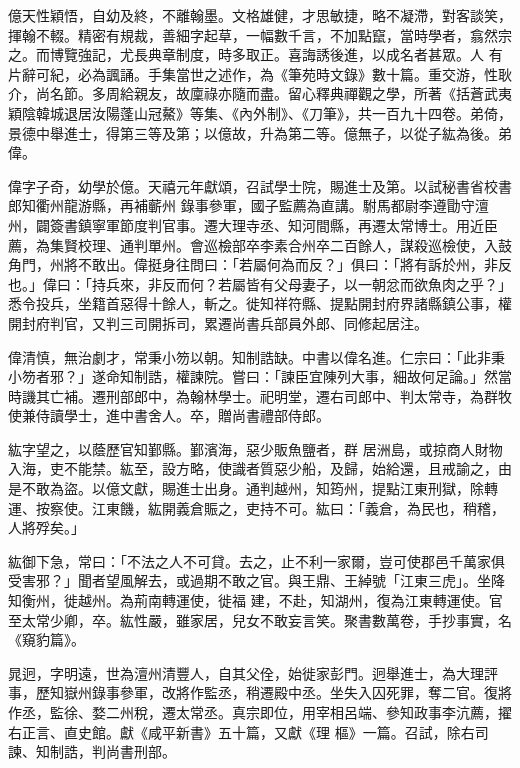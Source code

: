 \begin{pinyinscope}
 億天性穎悟，自幼及終，不離翰墨。文格雄健，才思敏捷，略不凝滯，對客談笑，揮翰不輟。精密有規裁，善細字起草，一幅數千言，不加點竄，當時學者，翕然宗之。而博覽強記，尤長典章制度，時多取正。喜誨誘後進，以成名者甚眾。人
 有片辭可紀，必為諷誦。手集當世之述作，為《筆苑時文錄》數十篇。重交游，性耿介，尚名節。多周給親友，故廩祿亦隨而盡。留心釋典禪觀之學，所著《括蒼武夷穎陰韓城退居汝陽蓬山冠鰲》等集、《內外制》、《刀筆》，共一百九十四卷。弟倚，景德中舉進士，得第三等及第；以億故，升為第二等。億無子，以從子紘為後。弟偉。



 偉字子奇，幼學於億。天禧元年獻頌，召試學士院，賜進士及第。以試秘書省校書郎知衢州龍游縣，再補蘄州
 錄事參軍，國子監薦為直講。駙馬都尉李遵勖守澶州，闢簽書鎮寧軍節度判官事。遷大理寺丞、知河間縣，再遷太常博士。用近臣薦，為集賢校理、通判單州。會巡檢部卒李素合州卒二百餘人，謀殺巡檢使，入鼓角門，州將不敢出。偉挺身往問曰：「若屬何為而反？」俱曰：「將有訴於州，非反也。」偉曰：「持兵來，非反而何？若屬皆有父母妻子，以一朝忿而欲魚肉之乎？」悉令投兵，坐籍首惡得十餘人，斬之。徙知祥符縣、提點開封府界諸縣鎮公事，權
 開封府判官，又判三司開拆司，累遷尚書兵部員外郎、同修起居注。



 偉清慎，無治劇才，常秉小笏以朝。知制誥缺。中書以偉名進。仁宗曰：「此非秉小笏者邪？」遂命知制誥，權諫院。嘗曰：「諫臣宜陳列大事，細故何足論。」然當時譏其亡補。遷刑部郎中，為翰林學士。祀明堂，遷右司郎中、判太常寺，為群牧使兼侍讀學士，進中書舍人。卒，贈尚書禮部侍郎。



 紘字望之，以蔭歷官知鄞縣。鄞濱海，惡少販魚鹽者，群
 居洲島，或掠商人財物入海，吏不能禁。紘至，設方略，使識者質惡少船，及歸，始給還，且戒諭之，由是不敢為盜。以億文獻，賜進士出身。通判越州，知筠州，提點江東刑獄，除轉運、按察使。江東饑，紘開義倉賑之，吏持不可。紘曰：「義倉，為民也，稍稽，人將殍矣。」



 紘御下急，常曰：「不法之人不可貸。去之，止不利一家爾，豈可使郡邑千萬家俱受害邪？」聞者望風解去，或過期不敢之官。與王鼎、王綽號「江東三虎」。坐降知衡州，徙越州。為荊南轉運使，徙福
 建，不赴，知湖州，復為江東轉運使。官至太常少卿，卒。紘性嚴，雖家居，兒女不敢妄言笑。聚書數萬卷，手抄事實，名《窺豹篇》。



 晁迥，字明遠，世為澶州清豐人，自其父佺，始徙家彭門。迥舉進士，為大理評事，歷知嶽州錄事參軍，改將作監丞，稍遷殿中丞。坐失入囚死罪，奪二官。復將作丞，監徐、婺二州稅，遷太常丞。真宗即位，用宰相呂端、參知政事李沆薦，擢右正言、直史館。獻《咸平新書》五十篇，又獻《理
 樞》一篇。召試，除右司諫、知制誥，判尚書刑部。




\end{pinyinscope}
